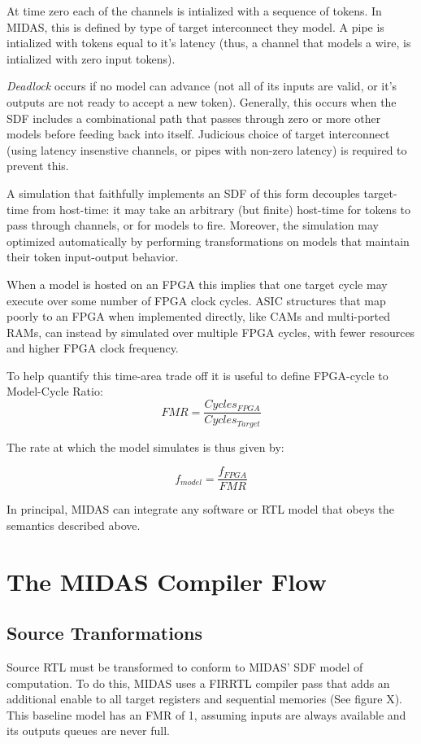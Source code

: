 At time zero each of the channels is intialized with a sequence of tokens. In
MIDAS, this is defined by type of target interconnect they model.  A pipe is
intialized with tokens equal to it's latency (thus, a channel that models a
wire, is intialized with zero input tokens).

\emph{Deadlock} occurs if no model can advance (not all of its inputs are
valid, or it's outputs are not ready to accept a new token). Generally, this
occurs when the SDF includes a combinational path that passes through zero
or more other models before feeding back into itself.  Judicious choice of target interconnect (using
latency insenstive channels, or pipes with non-zero latency) is required to
prevent this.

A simulation that faithfully implements an SDF of this form decouples
target-time from host-time: it may take an arbitrary (but finite) host-time for
tokens to pass through channels, or for models to fire.  Moreover, the
simulation may optimized automatically by performing transformations on models
that maintain their token input-output behavior.

When a model is hosted on an FPGA this implies that one target cycle may
execute over some number of FPGA clock cycles.  ASIC structures that map poorly
to an FPGA when implemented directly, like CAMs and multi-ported RAMs, can
instead by simulated over multiple FPGA cycles, with fewer resources and higher
FPGA clock frequency.


To help quantify this time-area trade off it is useful to define FPGA-cycle to Model-Cycle Ratio\cite{APorts}:
$$ FMR = \frac{Cycles_{FPGA}}{Cycles_{Target}} $$

\noindent The rate at which the model simulates is thus given by:

$$ f_{model} = \frac{f_{FPGA}}{FMR} $$

In principal, MIDAS can integrate any software or RTL model that obeys the semantics described above.


\section{The MIDAS Compiler Flow}


\subsection{Source Tranformations}

Source RTL must be transformed to conform to MIDAS' SDF model of computation.
To do this, MIDAS uses a FIRRTL compiler pass that adds an additional enable to
all target registers and sequential memories \TODO(See figure X). This baseline
model has an FMR of 1, assuming inputs are always available and its outputs
queues are never full.

